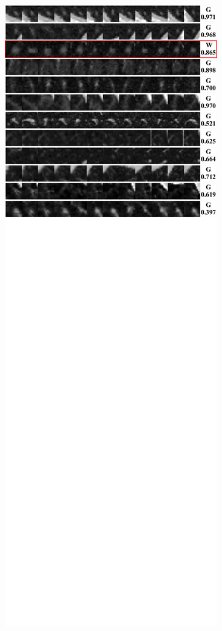 \documentclass[onecolumn]{IEEEtran}
\begin{document}
\begin{figure}[H]
{\includegraphics[width=0.45\columnwidth]{./images/elcap-msnodules-ggo1}
}
\end{figure}


\newpage
\end{document}
